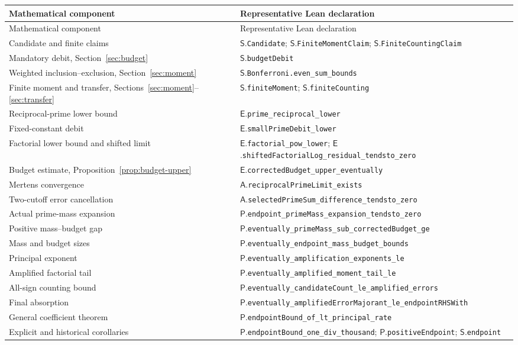 \documentclass[11pt,a4paper]{article}
\theoremstyle{definition}
\theoremstyle{remark}
\numberwithin{equation}{section}
\newcommand{\leanname}[1]{{\small\nolinkurl{#1}}}
\begin{document}
\begingroup\small
\renewcommand{\arraystretch}{1.18}
\begin{longtable}{@{}>{\raggedright\arraybackslash}p{}>{\raggedright\arraybackslash}p{}@{}}
\toprule
Mathematical component & Representative Lean declaration \\
\midrule
\endfirsthead
\toprule
Mathematical component & Representative Lean declaration \\
\midrule
\endhead
\bottomrule
\endfoot
Candidate and finite claims & $\mathsf{S}$.\leanname{Candidate};
 $\mathsf{S}$.\leanname{FiniteMomentClaim};
 $\mathsf{S}$.\leanname{FiniteCountingClaim} \\
Mandatory debit, Section~\ref{sec:budget} &
 $\mathsf{S}$.\leanname{budgetDebit} \\
Weighted inclusion--exclusion, Section~\ref{sec:moment} &
 $\mathsf{S}$.\leanname{Bonferroni.even_sum_bounds} \\
Finite moment and transfer, Sections~\ref{sec:moment}--\ref{sec:transfer} &
 $\mathsf{S}$.\leanname{finiteMoment};
 $\mathsf{S}$.\leanname{finiteCounting} \\
Reciprocal-prime lower bound &
 $\mathsf{E}$.\leanname{prime_reciprocal_lower} \\
Fixed-constant debit &
 $\mathsf{E}$.\leanname{smallPrimeDebit_lower} \\
Factorial lower bound and shifted limit &
 $\mathsf{E}$.\leanname{factorial_pow_lower};
 $\mathsf{E}$.\leanname{shiftedFactorialLog_residual_tendsto_zero} \\
Budget estimate, Proposition~\ref{prop:budget-upper} &
 $\mathsf{E}$.\leanname{correctedBudget_upper_eventually} \\
Mertens convergence &
 $\mathsf{A}$.\leanname{reciprocalPrimeLimit_exists} \\
Two-cutoff error cancellation &
 $\mathsf{A}$.\leanname{selectedPrimeSum_difference_tendsto_zero} \\
Actual prime-mass expansion &
 $\mathsf{P}$.\leanname{endpoint_primeMass_expansion_tendsto_zero} \\
Positive mass--budget gap &
 $\mathsf{P}$.\leanname{eventually_primeMass_sub_correctedBudget_ge} \\
Mass and budget sizes &
 $\mathsf{P}$.\leanname{eventually_endpoint_mass_budget_bounds} \\
Principal exponent &
 $\mathsf{P}$.\leanname{eventually_amplification_exponents_le} \\
Amplified factorial tail &
 $\mathsf{P}$.\leanname{eventually_amplified_moment_tail_le} \\
All-sign counting bound &
 $\mathsf{P}$.\leanname{eventually_candidateCount_le_amplified_errors} \\
Final absorption &
 $\mathsf{P}$.\leanname{eventually_amplifiedErrorMajorant_le_endpointRHSWith} \\
General coefficient theorem &
 $\mathsf{P}$.\leanname{endpointBound_of_lt_principal_rate} \\
Explicit and historical corollaries &
 $\mathsf{P}$.\leanname{endpointBound_one_div_thousand};
 $\mathsf{P}$.\leanname{positiveEndpoint};
 $\mathsf{S}$.\leanname{endpoint} \\
\end{longtable}
\end{document}
